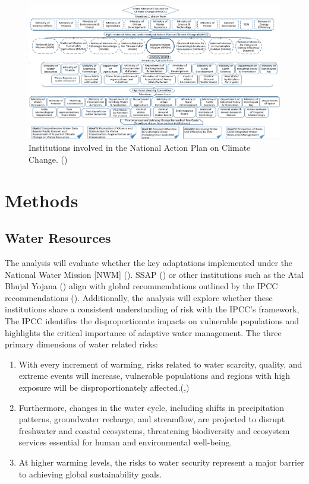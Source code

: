 \documentclass[12pt]{article}
\begin{document}
\begin{figure}[h]
  \centering
  \includegraphics[width = \textwidth]{NAPCC_india.jpg}
  \caption{Institutions involved in the National Action Plan on Climate Change. (\cite{azohani_2017})}
\end{figure}

\pagebreak


\section*{Methods}
\subsection*{Water Resources}
The analysis will evaluate whether the key adaptations implemented under the National Water Mission [NWM] (\cite{napcc_2008}).
SSAP (\cite{state_specific_action_plan}) or other institutions such as the Atal Bhujal Yojana (\cite{nandakumaran_2020}) align with 
global recommendations outlined by the IPCC recommendations (\cite{ipcc_technical_summary}). Additionally, the analysis will 
explore whether these institutions share a consistent understanding of risk with the IPCC’s framework, The IPCC identifies 
the disproportionate impacts on vulnerable populations and highlights the critical importance of adaptive water management. The three primary dimensions of water related risks:
\begin{enumerate}
  \item With every increment of warming, risks related to water scarcity, quality, and extreme events will increase, vulnerable populations and regions with high exposure will be disproportionately affected.(\cite{ipcc_technical_summary},)
  \item Furthermore, changes in the water cycle, including shifts in precipitation patterns, groundwater recharge, and streamflow, are projected to disrupt freshwater and coastal ecosystems, threatening biodiversity 
  and ecosystem services essential for human and environmental well-being.
  \item At higher warming levels, the risks to water security represent a major barrier to achieving global sustainability goals.
\end{enumerate}
\end{document}
